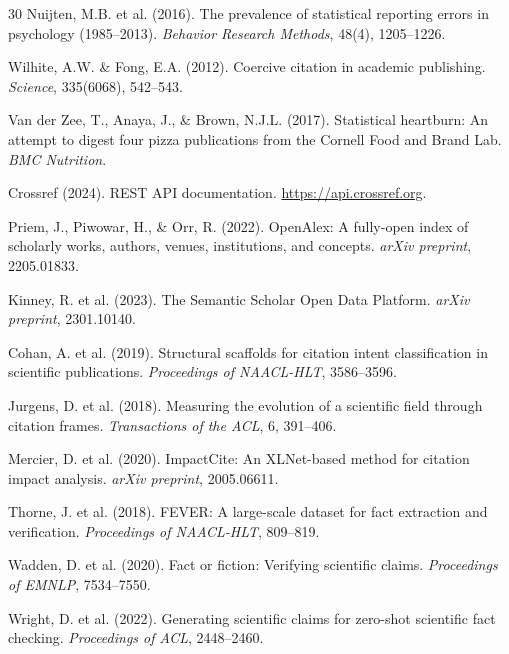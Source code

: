 \documentclass[sigconf,nonacm]{acmart}
\begin{document}
\begin{thebibliography}{30}
Nuijten, M.B. et al. (2016).
\newblock The prevalence of statistical reporting errors in psychology (1985--2013).
\newblock \emph{Behavior Research Methods}, 48(4), 1205--1226.

Wilhite, A.W. \& Fong, E.A. (2012).
\newblock Coercive citation in academic publishing.
\newblock \emph{Science}, 335(6068), 542--543.

Van der Zee, T., Anaya, J., \& Brown, N.J.L. (2017).
\newblock Statistical heartburn: An attempt to digest four pizza publications from the Cornell Food and Brand Lab.
\newblock \emph{BMC Nutrition}.

Crossref (2024).
\newblock REST API documentation.
\newblock \url{https://api.crossref.org}.

Priem, J., Piwowar, H., \& Orr, R. (2022).
\newblock OpenAlex: A fully-open index of scholarly works, authors, venues, institutions, and concepts.
\newblock \emph{arXiv preprint}, 2205.01833.

Kinney, R. et al. (2023).
\newblock The Semantic Scholar Open Data Platform.
\newblock \emph{arXiv preprint}, 2301.10140.

Cohan, A. et al. (2019).
\newblock Structural scaffolds for citation intent classification in scientific publications.
\newblock \emph{Proceedings of NAACL-HLT}, 3586--3596.

Jurgens, D. et al. (2018).
\newblock Measuring the evolution of a scientific field through citation frames.
\newblock \emph{Transactions of the ACL}, 6, 391--406.

Mercier, D. et al. (2020).
\newblock ImpactCite: An XLNet-based method for citation impact analysis.
\newblock \emph{arXiv preprint}, 2005.06611.

Thorne, J. et al. (2018).
\newblock FEVER: A large-scale dataset for fact extraction and verification.
\newblock \emph{Proceedings of NAACL-HLT}, 809--819.

Wadden, D. et al. (2020).
\newblock Fact or fiction: Verifying scientific claims.
\newblock \emph{Proceedings of EMNLP}, 7534--7550.

Wright, D. et al. (2022).
\newblock Generating scientific claims for zero-shot scientific fact checking.
\newblock \emph{Proceedings of ACL}, 2448--2460.


\end{thebibliography}
\end{document}

